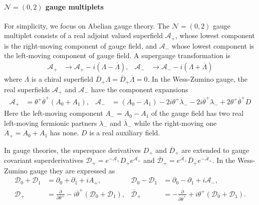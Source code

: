 \documentclass{article}
\numberwithin{equation}{section}
\begin{document}
\paragraph{$\mathcal{N}=(0,2)$ gauge multiplets}
For simplicity, we focus on Abelian gauge theory. 
The $\mathcal{N}=(0,2)$ gauge multiplet consists of a real  adjoint valued superfield $\mathcal{A}_{+}$, 
whose lowest component is the right-moving component of gauge field, and $\mathcal{A}_{-}$ whose lowest component is the left-moving component of gauge field. 
A supergauge transformation is 
\begin{align}
\label{sgauge1}
\mathcal{A}_{+}&\rightarrow \mathcal{A}_{+}-i\left(\Lambda-\overline{\Lambda}\right),& 
\mathcal{A}_{-}&\rightarrow \mathcal{A}_{-}-i\left(\Lambda+\overline{\Lambda}\right)
\end{align}
where $\Lambda$ is a chiral superfield $\overline{D}_{+}\Lambda=\overline{D}_{+}\overline{\Lambda}=0$. 
In the Wess-Zumino gauge, the real superfields $\mathcal{A}_{+}$ and $\mathcal{A}_{-}$ have the component expansions
\begin{align}
\label{02_gmult1}
\mathcal{A}_{+}&=\theta^{+}\overline{\theta}^{+}\left(A_{0}+A_{1}\right),& 
\mathcal{A}_{-}&=\left(A_{0}-A_{1}\right)-2i\theta^{+}\overline{\lambda}_{-}-2i\overline{\theta}^{+}\lambda_{-}+2\theta^{+}\overline{\theta}^{+}D
\end{align}
Here the left-moving component $A_{-}=A_{0}-A_{1}$ of the gauge field has two real left-moving fermionic partners 
$\lambda_{-}$ and $\overline{\lambda}_{-}$ while the right-moving one $A_{+}=A_{0}+A_{1}$ has none. 
$D$ is a real auxiliary field. 

In gauge theories, the superspace derivatives $D_{+}$ and $\overline{D}_{+}$ 
are extended to gauge covariant superderivatives 
$\mathcal{D}_{+}=e^{-\mathcal{A}_{+}}D_{+}e^{\mathcal{A}_{+}}$ 
and $\overline{\mathcal{D}}_{+}=e^{\overline{\mathcal{A}}_{+}}\overline{D}_{+}e^{-\overline{\mathcal{A}}_{+}}$. 
In the Wess-Zumino gauge they are expressed as
\begin{align}
\label{02_gcov1}
\mathcal{D}_{0}+\mathcal{D}_{1}&=\partial_{0}+\partial_{1}+iA_{+},& 
\mathcal{D}_{0}-\mathcal{D}_{1}&=\partial_{0}-\partial_{1}+i\mathcal{A}_{-}, \\
\label{02_gcov2}
\mathcal{D}_{+}&=\frac{\partial}{\partial \theta^{+}}
-i\overline{\theta}^{+}\left(\mathcal{D}_{0}+\mathcal{D}_{1}\right),& 
\overline{\mathcal{D}}_{+}&=-\frac{\partial}{\partial \overline{\theta}^{+}}
+i\theta^{+}\left(\mathcal{D}_{0}+\mathcal{D}_{1}\right). 
\end{align}
\end{document}
